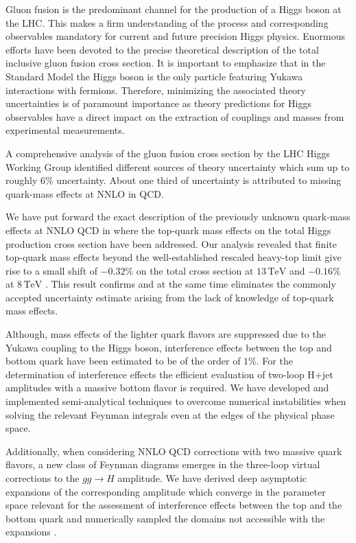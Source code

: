 \documentclass{FBR_Bericht_2025}
\begin{document}
\begin{refsection}
Gluon fusion is the predominant channel for the production of a Higgs boson at the LHC. This makes a firm understanding of the process and corresponding observables mandatory for current and future precision Higgs physics. Enormous efforts have been devoted to the precise theoretical description of the total inclusive gluon fusion cross section. It is important to emphasize that in the Standard Model the Higgs boson is the only particle featuring Yukawa interactions with fermions. Therefore, minimizing the associated theory uncertainties is of paramount importance as theory predictions for Higgs observables have a direct impact on the extraction of couplings and masses from experimental measurements.

A comprehensive analysis of the gluon fusion cross section by the LHC Higgs Working Group identified different sources of theory uncertainty which sum up to roughly $6\%$ uncertainty. About one third of uncertainty is attributed to missing quark-mass effects at NNLO in QCD.

We have put forward the exact description of the previously unknown quark-mass effects at NNLO QCD in \cite{Czakon:2021yub} where the top-quark mass effects on the total Higgs production cross section have been addressed. Our analysis revealed that finite top-quark mass effects beyond the well-established rescaled heavy-top limit give rise to a small shift of $-0.32\%$ on the total cross section at $13\,\mathrm{TeV}$ and $-0.16\%$ at $8\,\mathrm{TeV}$ \cite{Czakon:2021yub}. This result confirms and at the same time eliminates the commonly accepted uncertainty estimate arising from the lack of knowledge of top-quark mass effects.

Although, mass effects of the lighter quark flavors are suppressed due to the Yukawa coupling to the Higgs boson, interference effects between the top and bottom quark have been estimated to be of the order of $1\%$. For the determination of interference effects the efficient evaluation of two-loop H+jet amplitudes with a massive bottom flavor is required. We have developed and implemented semi-analytical techniques to overcome numerical instabilities when solving the relevant Feynman integrals even at the edges of the physical phase space.

Additionally, when considering NNLO QCD corrections with two massive quark flavors, a new class of Feynman diagrams emerges in the three-loop virtual corrections to the $gg \to H$ amplitude. We have derived deep asymptotic expansions of the corresponding amplitude which converge in the parameter space relevant for the assessment of interference effects between the top and the bottom quark and numerically sampled the domains not accessible with the expansions \cite{Niggetiedt:2023uyk}.


\end{refsection}
\end{document}
